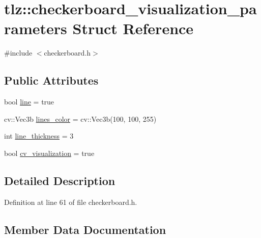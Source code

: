 \hypertarget{structtlz_1_1checkerboard__visualization__parameters}{}\section{tlz\+:\+:checkerboard\+\_\+visualization\+\_\+parameters Struct Reference}
\label{structtlz_1_1checkerboard__visualization__parameters}


{\ttfamily \#include $<$checkerboard.\+h$>$}

\subsection*{Public Attributes}
\begin{DoxyCompactItemize}
\item 
bool \hyperlink{structtlz_1_1checkerboard__visualization__parameters_a6c3b88a31a989b45bb2c05e3aa8663f6}{line} = true
\item 
cv\+::\+Vec3b \hyperlink{structtlz_1_1checkerboard__visualization__parameters_a82a26ebc9751cc9f44f9b1ff1b901e58}{lines\+\_\+color} = cv\+::\+Vec3b(100, 100, 255)
\item 
int \hyperlink{structtlz_1_1checkerboard__visualization__parameters_aed36c2d7efc9d049014a9036ca36886f}{line\+\_\+thickness} = 3
\item 
bool \hyperlink{structtlz_1_1checkerboard__visualization__parameters_ac1ed8e800153fc2f33391af0b005ed54}{cv\+\_\+visualization} = true
\end{DoxyCompactItemize}


\subsection{Detailed Description}


Definition at line 61 of file checkerboard.\+h.



\subsection{Member Data Documentation}
